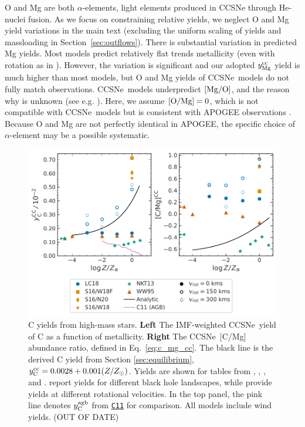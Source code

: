 \documentclass[fleqn,usenatbib]{mnras}
\newcommand{\cxi}{\texttt{\hyperlink{C11}{C11}}}
\newcommand{\apogee}{APOGEE}
\newcommand{\cc}{CCSNe}
\newcommand{\imf}{IMF}
\newcommand{\Ycc}{\ensuremath{y_{\rm C}^{\rm cc}}}
\newcommand{\Yoc}{\ensuremath{y_{\rm Mg}^{\rm cc}}}
\newcommand{\Ycagb}{\ensuremath{y_{\rm C}^{\rm agb}}}
\begin{document}
O and Mg are both $\alpha$-elements, light elements produced in \cc{} through He-nuclei fusion. 
As we focus on constraining relative yields, we neglect O and Mg yield variations in the main text (excluding the uniform scaling of yields and massloading in Section~\ref{sec:outflows}). There is substantial variation in predicted Mg yields. 
Most models predict relatively flat trends metallicity (even with rotation as in \citealt{LC18}). 
However, the variation is significant and our adopted $\Yoc$ yield is much higher than most models, but O and Mg yields of \cc\ models do not fully match observations. \cc\ models underpredict $[{\rm Mg}/{\rm O}]$, and the reason why is unknown (see e.g. \citealt{emily+21}). Here, we assume ${\rm [O/Mg]} = 0$, which is not compatible with \cc\ models but is consistent with \apogee{} observations \citep{weinberg+19, weinberg+22}.
Because O and Mg are not perfectly identical in \apogee{}, the specific choice of $\alpha$-element may be a possible systematic.
    

\begin{figure}
    \centering
    \includegraphics{cc_yields.pdf}
    \caption[High-Mass Star Carbon Yields]{
        C yields from high-mass stars.
        \textbf{Left} The \imf-weighted \cc\ yield of C as a function of metallicity.
        \textbf{Right} The \cc\ [C/Mg] abundance ratio, defined in Eq.~\ref{eq:c_mg_cc}. The black line is the derived C yield from Section \ref{sec:equilibrium},
    $\Ycc = 0.0028 + 0.001 (Z/Z_{\odot})$. Yields are shown for tables from 
    \citet[red triangles]{WW95}, \citet[orange squares and diamonds]{sukhbold+16}, 
    \citet[green stars]{NKT13}, and \citet[blue circles]{LC18}. \citet{sukhbold+16} report yields for different black hole landscapes, while \citet{LC18} provide yields at different rotational velocities.
    In the top panel, the pink line denotes $\Ycagb$ from \cxi{} for comparison. All models include wind yields. 
    (OUT OF DATE)
}
    \label{fig:y_cc}
\end{figure}
\end{document}
